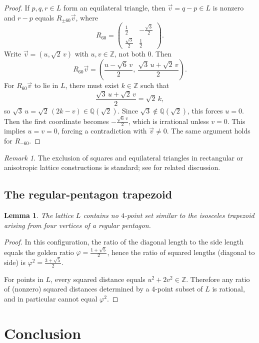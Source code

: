 \documentclass[11pt, reqno]{amsart}
\newtheorem{lemma}[theorem]{Lemma}
\theoremstyle{definition}
\theoremstyle{remark}
\newtheorem*{remark}{Remark}
\newcommand{\Q}{\mathbb{Q}}
\newcommand{\Z}{\mathbb{Z}}
\begin{document}
\begin{proof}
If $p,q,r\in L$ form an equilateral triangle, then $\vec v=q-p\in L$ is nonzero and $r-p$ equals $R_{\pm 60}\vec v$, where
\[
R_{60}=\begin{pmatrix} \tfrac12 & -\tfrac{\sqrt3}{2}\\[2pt] \tfrac{\sqrt3}{2} & \tfrac12\end{pmatrix}.
\]
Write $\vec v=(u,\sqrt2\,v)$ with $u,v\in\Z$, not both $0$. Then
\[
R_{60}\vec v=\left(\frac{u-\sqrt6\,v}{2},\ \frac{\sqrt3\,u+\sqrt2\,v}{2}\right).
\]
For $R_{60}\vec v$ to lie in $L$, there must exist $k\in\Z$ such that
\[
\frac{\sqrt3\,u+\sqrt2\,v}{2}=\sqrt2\,k,
\]
so $\sqrt3\,u=\sqrt2\,(2k-v)\in\Q(\sqrt2)$. Since $\sqrt3\notin\Q(\sqrt2)$, this forces $u=0$. Then the first coordinate
becomes $-\frac{\sqrt6\,v}{2}$, which is irrational unless $v=0$. This implies $u=v=0$, forcing a contradiction with $\vec v\ne 0$.
The same argument holds for $R_{-60}$.
\end{proof}

\begin{remark}
The exclusion of squares and equilateral triangles in rectangular or anisotropic lattice constructions is standard; see \cite{sheffer2014blog} for related discussion.
\end{remark}

\subsection{The regular-pentagon trapezoid}

\begin{lemma}\label{lem:nopentagon}
The lattice $L$ contains no $4$-point set similar to the isosceles trapezoid arising from four vertices of a regular pentagon.
\end{lemma}

\begin{proof}
In this configuration, the ratio of the diagonal length to the side length equals the golden ratio
$\varphi=\frac{1+\sqrt5}{2}$, hence the ratio of squared lengths (diagonal to side) is $\varphi^2=\frac{3+\sqrt5}{2}$.

For points in $L$, every squared distance equals $u^2+2v^2\in\Z$. Therefore any ratio of (nonzero) squared distances
determined by a $4$-point subset of $L$ is rational, and in particular cannot equal $\varphi^2$.
\end{proof}


\section{Conclusion}
\end{document}
